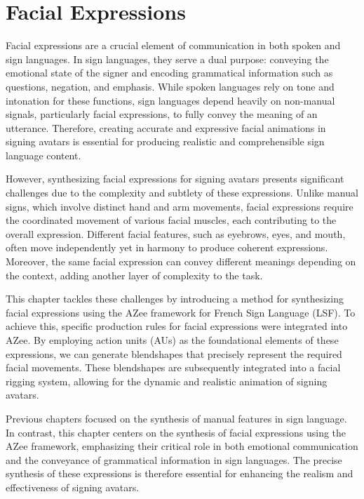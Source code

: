 \documentclass[../../main]{subfiles}
\begin{document}
\chapter{Facial Expressions}
\label{ch:facial_expressions}

Facial expressions are a crucial element of communication in both spoken and sign languages. In sign languages, they serve a dual purpose: conveying the emotional state of the signer and encoding grammatical information such as questions, negation, and emphasis. While spoken languages rely on tone and intonation for these functions, sign languages depend heavily on non-manual signals, particularly facial expressions, to fully convey the meaning of an utterance. Therefore, creating accurate and expressive facial animations in signing avatars is essential for producing realistic and comprehensible sign language content.

However, synthesizing facial expressions for signing avatars presents significant challenges due to the complexity and subtlety of these expressions. Unlike manual signs, which involve distinct hand and arm movements, facial expressions require the coordinated movement of various facial muscles, each contributing to the overall expression. Different facial features, such as eyebrows, eyes, and mouth, often move independently yet in harmony to produce coherent expressions. Moreover, the same facial expression can convey different meanings depending on the context, adding another layer of complexity to the task.

This chapter tackles these challenges by introducing a method for synthesizing facial expressions using the AZee framework for French Sign Language (LSF). To achieve this, specific production rules for facial expressions were integrated into AZee. By employing action units (AUs) as the foundational elements of these expressions, we can generate blendshapes that precisely represent the required facial movements. These blendshapes are subsequently integrated into a facial rigging system, allowing for the dynamic and realistic animation of signing avatars.

Previous chapters focused on the synthesis of manual features in sign language. In contrast, this chapter centers on the synthesis of facial expressions using the AZee framework, emphasizing their critical role in both emotional communication and the conveyance of grammatical information in sign languages. The precise synthesis of these expressions is therefore essential for enhancing the realism and effectiveness of signing avatars.
\end{document}
